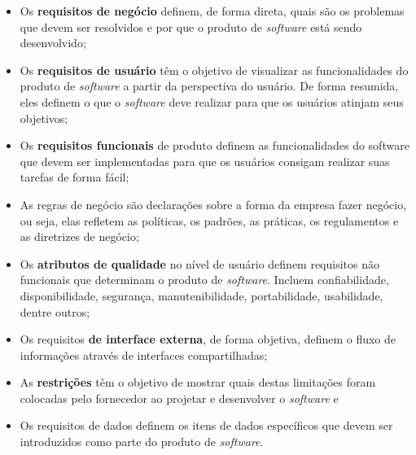 \begin{itemize}
    \begin{itemize}
    
        \item Os \textbf{requisitos de negócio} definem, de forma direta, quais são os problemas que devem ser resolvidos e por que o produto de \textit{software} está sendo desenvolvido;
        
        \item Os \textbf{requisitos de usuário} têm o objetivo de visualizar as funcionalidades do produto de \textit{software} a partir da perspectiva do usuário. De forma resumida, eles definem o que o \textit{software} deve realizar para que os usuários atinjam seus objetivos;
        
        \item Os \textbf{requisitos funcionais} de produto definem as funcionalidades do software que devem ser implementadas para que os usuários consigam realizar suas tarefas de forma fácil;
        
        \item As regras de negócio são declarações sobre a forma da empresa fazer negócio, ou seja, elas refletem as políticas, os padrões, as práticas, os regulamentos e as diretrizes de negócio;
        
        \item Os \textbf{atributos de qualidade} no nível de usuário definem requisitos não funcionais que determinam o produto de \textit{software}. Incluem confiabilidade, disponibilidade, segurança, manutenibilidade, portabilidade, usabilidade, dentre outros;
        
        \item Os requisitos\textbf{ de interface externa}, de forma objetiva, definem o fluxo de informações através de interfaces compartilhadas;
        
        \item As \textbf{restrições} têm o objetivo de mostrar quais destas limitações foram colocadas pelo fornecedor ao projetar e desenvolver o \textit{software} e
        
        \item Os requisitos de dados definem os itens de dados específicos que devem ser introduzidos como parte do produto de \textit{software}.
    
    \end{itemize}
    

\end{itemize}
